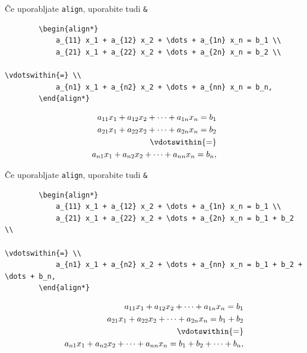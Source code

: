 \documentclass{beamer}
\begin{document}
\begin{frame}[fragile]{Če uporabljate \texttt{align}, uporabite tudi \texttt{\&}}
    \begin{slaboenv}
    \begin{verbatim}
        \begin{align*}
            a_{11} x_1 + a_{12} x_2 + \dots + a_{1n} x_n = b_1 \\
            a_{21} x_1 + a_{22} x_2 + \dots + a_{2n} x_n = b_2 \\
                                                         \vdotswithin{=} \\
            a_{n1} x_1 + a_{n2} x_2 + \dots + a_{nn} x_n = b_n,
        \end{align*}
        \end{verbatim}

    \begin{align*}
        a_{11} x_1 + a_{12} x_2 + \dots + a_{1n} x_n = b_1 \\
        a_{21} x_1 + a_{22} x_2 + \dots + a_{2n} x_n = b_2 \\
                                                     \vdotswithin{=} \\
        a_{n1} x_1 + a_{n2} x_2 + \dots + a_{nn} x_n = b_n,
    \end{align*}
    \end{slaboenv}
\end{frame}

\begin{frame}[fragile]{Če uporabljate \texttt{align}, uporabite tudi \texttt{\&}}
    \begin{slaboenv}
    \begin{verbatim}
        \begin{align*}
            a_{11} x_1 + a_{12} x_2 + \dots + a_{1n} x_n = b_1 \\
            a_{21} x_1 + a_{22} x_2 + \dots + a_{2n} x_n = b_1 + b_2 \\
                                                         \vdotswithin{=} \\
            a_{n1} x_1 + a_{n2} x_2 + \dots + a_{nn} x_n = b_1 + b_2 + \dots + b_n,
        \end{align*}
        \end{verbatim}

    \begin{align*}
        a_{11} x_1 + a_{12} x_2 + \dots + a_{1n} x_n = b_1 \\
        a_{21} x_1 + a_{22} x_2 + \dots + a_{2n} x_n = b_1 + b_2 \\
                                                     \vdotswithin{=} \\
        a_{n1} x_1 + a_{n2} x_2 + \dots + a_{nn} x_n = b_1 + b_2 + \dots + b_n,
    \end{align*}
    \end{slaboenv}
\end{frame}
\end{document}
